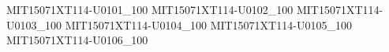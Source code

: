 
{MIT15071XT114-U0101_100}
{MIT15071XT114-U0102_100}
{MIT15071XT114-U0103_100}
{MIT15071XT114-U0104_100}
{MIT15071XT114-U0105_100}
{MIT15071XT114-U0106_100}